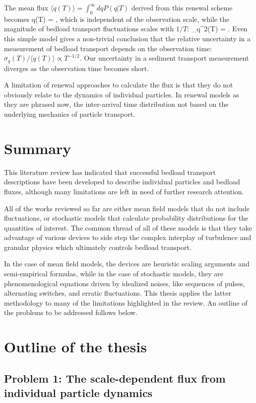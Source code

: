 The mean flux $\langle q (T)\rangle = \int_0^\infty dq P(q|T)$ derived from this renewal scheme becomes
\be \langle q(T) \rangle = \Lambda, \ee
which is independent of the observation scale, while the magnitude of bedload transport fluctuations scales with $1/T$: 
\be \sigma_q^2(T) = .\ee
Even this simple model gives a non-trivial conclusion that the relative uncertainty in a measurement of bedload transport depends on the observation time: $\sigma_q(T)/\langle q(T) \rangle \propto T^{-1/2}.$ Our uncertainty in a sediment transport measurement diverges as the observation time becomes short.

A limitation of renewal approaches to calculate the flux is that they do not obviously relate to the dynamics of individual particles. In renewal models as they are phrased now, the inter-arrival time distribution not based on the underlying mechanics of particle transport. 

\section{Summary}

This literature review has indicated that successful bedload transport descriptions have been developed to describe individual particles and bedload fluxes, although many limitations are left in need of further research attention.

All of the works reviewed so far are either mean field models that do not include fluctuations, or stochastic models that calculate probability distributions for the quantities of interest.
The common thread of all of these models is that they take advantage of various devices to side step the complex interplay of turbulence and granular physics which ultimately controls bedload transport.

In the case of mean field models, the devices are heuristic scaling arguments and semi-empirical formulas, while in the case of stochastic models, they are phenomenological equations driven by idealized noises, like sequences of pulses, alternating switches, and erratic fluctuations.
This thesis applies the latter methodology to many of the limitations highlighted in the review. An outline of the problems to be addressed follows below.

\section{Outline of the thesis}
\subsection{Problem 1: The scale-dependent flux from individual particle dynamics}

